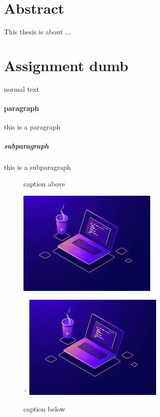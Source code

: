 \documentclass[a4paper,10pt]{article}
\begin{document}
    
    \section{Abstract}
    This thesis is about ...
    \tableofcontents
    \section{Assignment dumb}
    normal text
    \paragraph{paragraph}
     this is a paragraph
    \subparagraph{subparagraph}
    this is a subparagraph
    \begin{figure}[!tbp]
    	\centering
    	\begin{minipage}[b]{0.4\textwidth}
    		 \caption{caption above}
    		 \label{marker}
    		\includegraphics[width=\textwidth]{programming}
    		\caption{caption below}
    	\end{minipage}
    	\hfill
    	\begin{minipage}[b]{0.4\textwidth}
´    		\includegraphics[width=\textwidth]{programming}
    	\end{minipage}
    \end{figure}
\end{document}
